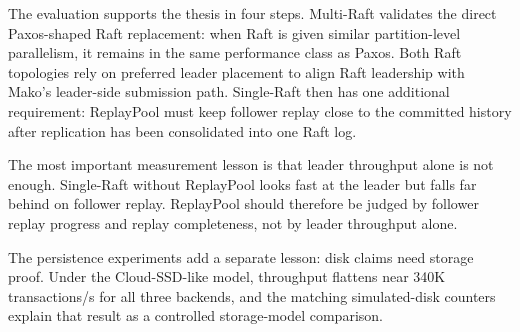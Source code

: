 The evaluation supports the thesis in four steps. Multi-Raft validates the
direct Paxos-shaped Raft replacement: when Raft is given similar partition-level
parallelism, it remains in the same performance class as Paxos. Both Raft
topologies rely on preferred leader placement to align Raft leadership with
Mako's leader-side submission path. Single-Raft then has one additional
requirement: ReplayPool must keep follower replay close to the committed
history after replication has been consolidated into one Raft log.

The most important measurement lesson is that leader throughput alone is not
enough. Single-Raft without ReplayPool looks fast at the leader but falls far
behind on follower replay. ReplayPool should therefore be judged by follower
replay progress and replay completeness, not by leader throughput alone.

The persistence experiments add a separate lesson: disk claims need storage
proof. Under the Cloud-SSD-like model, throughput flattens near 340K
transactions/s for all three backends, and the matching simulated-disk
counters explain that result as a controlled storage-model comparison.
